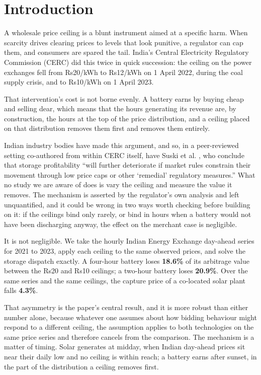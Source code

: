 \documentclass[conference,a4paper]{IEEEtran}
\begin{document}
\section{Introduction}

A wholesale price ceiling is a blunt instrument aimed at a specific harm. When
scarcity drives clearing prices to levels that look punitive, a regulator can cap
them, and consumers are spared the tail. India's Central Electricity Regulatory
Commission (CERC) did this twice in quick succession: the ceiling on the power
exchanges fell from Rs20/kWh to Rs12/kWh on 1 April 2022, during the coal supply
crisis, and to Rs10/kWh on 1 April 2023.

That intervention's cost is not borne evenly. A battery earns by buying cheap
and selling dear, which means that the hours generating its revenue are, by
construction, the hours at the top of the price distribution, and a ceiling
placed on that distribution removes them first and removes them entirely.

Indian industry bodies have made this argument, and so, in a peer-reviewed
setting co-authored from within CERC itself, have Suski et al.
\cite{suski2026}, who conclude that storage profitability ``will further
deteriorate if market rules constrain their movement through low price caps or
other `remedial' regulatory measures.'' What no study we are aware of does is
vary the ceiling and measure the value it removes. The mechanism is asserted by
the regulator's own analysis and left unquantified, and it could be wrong in two
ways worth checking before building on it: if the ceilings bind only rarely, or
bind in hours when a battery would not have been discharging anyway, the effect
on the merchant case is negligible.

It is not negligible. We take the hourly Indian Energy Exchange day-ahead series
for 2021 to 2023, apply each ceiling to the same observed prices, and solve the
storage dispatch exactly. A four-hour battery loses \textbf{18.6\%} of its
arbitrage value between the Rs20 and Rs10 ceilings; a two-hour battery loses
\textbf{20.9\%}. Over the same series and the same ceilings, the capture price of
a co-located solar plant falls \textbf{4.3\%}.

That asymmetry is the paper's central result, and it is more robust than either
number alone, because whatever one assumes about how bidding behaviour might
respond to a different ceiling, the assumption applies to both technologies on
the same price series and therefore cancels from the comparison. The mechanism
is a matter of timing. Solar generates at midday, when Indian day-ahead prices
sit near their daily low and no ceiling is within reach; a battery earns after
sunset, in the part of the distribution a ceiling removes first.
\end{document}
